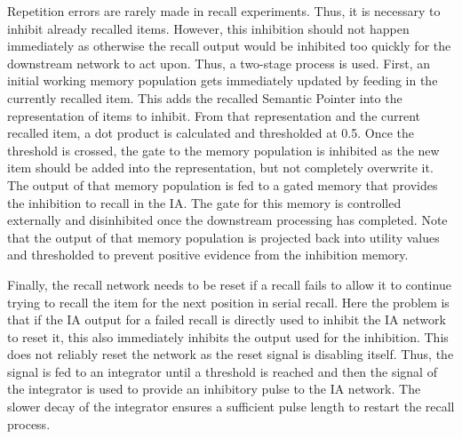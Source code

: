 Repetition errors are rarely made in recall experiments.
Thus, it is necessary to inhibit already recalled items.
However, this inhibition should not happen immediately as otherwise the recall output would be inhibited too quickly for the downstream network to act upon.
Thus, a two-stage process is used.
First, an initial working memory population gets immediately updated by feeding in the currently recalled item.
This adds the recalled Semantic Pointer into the representation of items to inhibit.
From that representation and the current recalled item, a dot product is calculated and thresholded at \num{0.5}.
Once the threshold is crossed, the gate to the memory population is inhibited as the new item should be added into the representation, but not completely overwrite it.
The output of that memory population is fed to a gated memory that provides the inhibition to recall in the IA\@.
The gate for this memory is controlled externally and disinhibited once the downstream processing has completed.
Note that the output of that memory population is projected back into utility values and thresholded to prevent positive evidence from the inhibition memory.

Finally, the recall network needs to be reset if a recall fails to allow it to continue trying to recall the item for the next position in serial recall.
Here the problem is that if the IA output for a failed recall is directly used to inhibit the IA network to reset it, this also immediately inhibits the output used for the inhibition.
This does not reliably reset the network as the reset signal is disabling itself.
Thus, the signal is fed to an integrator until a threshold is reached and then the signal of the integrator is used to provide an inhibitory pulse to the IA network.
The slower decay of the integrator ensures a sufficient pulse length to restart the recall process.

